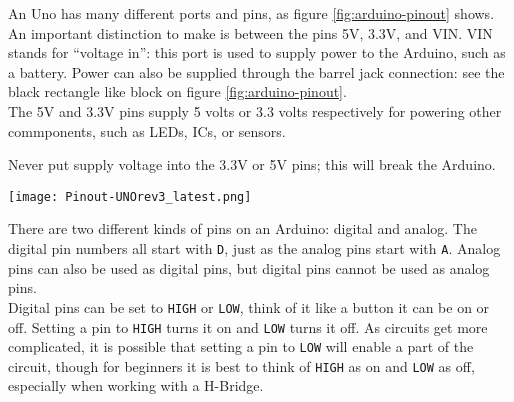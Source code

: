 \documentclass[../TinyBot.tex]{subfiles}
\begin{document}
An Uno has many different ports and pins, as figure \ref{fig:arduino-pinout} shows. \\

An important distinction to make is between the pins 5V, 3.3V, and VIN. VIN stands for ``voltage in'':
this port is used to supply power to the Arduino, such as a battery. Power can also be supplied through the
barrel jack connection: see the black rectangle like block on figure \ref{fig:arduino-pinout}. \\

The 5V and 3.3V  pins supply 5 volts or 3.3 volts respectively for powering other commponents, such as LEDs, ICs, or sensors.  \\

\begin{warningbox}
    Never put supply voltage into the 3.3V or 5V pins; this will break the Arduino. 
\end{warningbox}


\begin{center}
    \texttt{[image: Pinout-UNOrev3\_latest.png]}
    \label{fig:arduino-pinout}
\end{center}


There are two different kinds of pins on an Arduino: digital and analog.
The digital pin numbers all start with \lstinline[]!D!, just as the analog pins start with \lstinline[]!A!.
Analog pins can also be used as digital pins, but digital pins cannot be used as analog pins. \\


Digital pins can be set to \lstinline[]!HIGH! or \lstinline[]!LOW!, think of it like a button it can be on or off.
Setting a pin to \lstinline[]!HIGH! turns it on and \lstinline[]!LOW! turns it off. As circuits get more complicated,
it is possible that setting a pin to \lstinline[]!LOW! will enable a part of the circuit,
though for beginners it is best to think of \lstinline[]!HIGH! as on and \lstinline[]!LOW! as off,
especially when working with a H-Bridge. 

\end{document}
